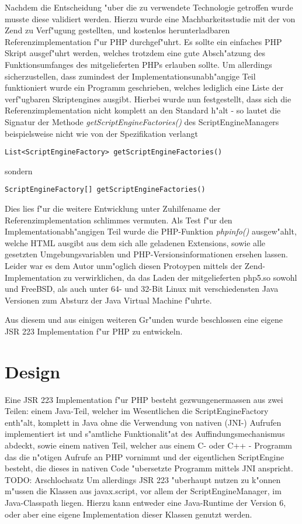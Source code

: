 Nachdem die Entscheidung "uber die zu verwendete Technologie getroffen wurde musste diese validiert werden. Hierzu wurde
eine Machbarkeitsstudie mit der von Zend zu Verf"ugung gestellten, und kostenlos herunterladbaren Referenzimplementation
f"ur PHP durchgef"uhrt. Es sollte ein einfaches PHP Skript ausgef"uhrt werden, welches trotzdem eine gute Absch"atzung
des Funktionsumfanges des mitgelieferten PHPs erlauben sollte. Um allerdings sicherzustellen, dass zumindest der 
Implementationsunabh"angige Teil funktioniert wurde ein Programm geschrieben, welches lediglich eine Liste der verf"ugbaren
Skriptengines ausgibt. Hierbei wurde nun festgestellt, dass sich die Referenzimplementation nicht komplett an den Standard
h"alt - so lautet die Signatur der Methode \emph{getScriptEngineFactories()} des ScriptEngineManagers beispielsweise 
nicht wie von der Spezifikation verlangt
\begin{lstlisting}[name=Vom Standard verlangte Signatur]
    List<ScriptEngineFactory> getScriptEngineFactories()
\end{lstlisting}
sondern
\begin{lstlisting}[name=Signatur in der Referenzimplementation]
    ScriptEngineFactory[] getScriptEngineFactories()
\end{lstlisting}
Dies lies f"ur die weitere Entwicklung unter Zuhilfename der Referenzimplementation schlimmes vermuten.
Als Test f"ur den Implementationabh"angigen Teil wurde die PHP-Funktion \emph{phpinfo()} ausgew"ahlt, welche
HTML ausgibt aus dem sich alle geladenen Extensions, sowie alle gesetzten Umgebungsvariablen und 
PHP-Versionsinformationen ersehen lassen. Leider war es dem Autor unm"oglich diesen Protoypen mittels der Zend-Implementation
zu verwirklichen, da das Laden der mitgelieferten php5.so sowohl und FreeBSD, als auch unter 64- und 32-Bit Linux mit verschiedensten
Java Versionen zum Absturz der Java Virtual Machine f"uhrte.

Aus diesem und aus einigen weiteren Gr"unden wurde beschlossen eine eigene JSR 223 Implementation f"ur PHP zu entwickeln.

\section{Design}
\label{sec:chap1:design}

Eine JSR 223 Implementation f"ur PHP besteht gezwungenermassen aus zwei Teilen: einem Java-Teil, welcher im Wesentlichen
die ScriptEngineFactory enth"alt, komplett in Java ohne die Verwendung von nativen (JNI-) Aufrufen implementiert ist und
s"amtliche Funktionalit"at des Auffindungsmechanismus abdeckt, sowie einem nativen Teil, welcher aus 
einem C- oder C++ - Programm das die n"otigen Aufrufe an PHP vornimmt und der eigentlichen ScriptEngine besteht, die dieses in
nativen Code "ubersetzte Programm mittels JNI anspricht. TODO: Arschlochsatz
Um allerdings JSR 223 "uberhaupt nutzen zu k"onnen m"ussen die Klassen aus javax.script, vor allem der ScriptEngineManager, 
im Java-Classpath liegen. Hierzu kann entweder eine Java-Runtime der Version 6, oder aber eine eigene Implementation dieser
Klassen genutzt werden.

